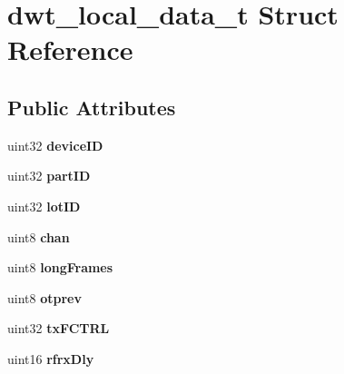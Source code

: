 \hypertarget{structdwt__local__data__t}{\section{dwt\-\_\-local\-\_\-data\-\_\-t Struct Reference}
\label{structdwt__local__data__t}
}
\subsection*{Public Attributes}
\begin{DoxyCompactItemize}
\item 
\hypertarget{structdwt__local__data__t_ad61966b6b97c1ce0865c62f374dbff82}{uint32 {\bfseries device\-I\-D}}\label{structdwt__local__data__t_ad61966b6b97c1ce0865c62f374dbff82}

\item 
\hypertarget{structdwt__local__data__t_a909a675193b5fdd7a1367b48fe6d35f1}{uint32 {\bfseries part\-I\-D}}\label{structdwt__local__data__t_a909a675193b5fdd7a1367b48fe6d35f1}

\item 
\hypertarget{structdwt__local__data__t_a710ed61fdddf71afd412400baa3bdd80}{uint32 {\bfseries lot\-I\-D}}\label{structdwt__local__data__t_a710ed61fdddf71afd412400baa3bdd80}

\item 
\hypertarget{structdwt__local__data__t_ae016b51f9d8961c68b5f11beddad4cc2}{uint8 {\bfseries chan}}\label{structdwt__local__data__t_ae016b51f9d8961c68b5f11beddad4cc2}

\item 
\hypertarget{structdwt__local__data__t_a5957f556073f450b2d834896d6a3add2}{uint8 {\bfseries long\-Frames}}\label{structdwt__local__data__t_a5957f556073f450b2d834896d6a3add2}

\item 
\hypertarget{structdwt__local__data__t_a6507cd73611daec040a2fba8b1c3a506}{uint8 {\bfseries otprev}}\label{structdwt__local__data__t_a6507cd73611daec040a2fba8b1c3a506}

\item 
\hypertarget{structdwt__local__data__t_a53a286c410d8831a8c4fef8cc1beab8c}{uint32 {\bfseries tx\-F\-C\-T\-R\-L}}\label{structdwt__local__data__t_a53a286c410d8831a8c4fef8cc1beab8c}

\item 
\hypertarget{structdwt__local__data__t_a6d069c386d9142e5b4f681a9ecaf63c8}{uint16 {\bfseries rfrx\-Dly}}\label{structdwt__local__data__t_a6d069c386d9142e5b4f681a9ecaf63c8}


\end{DoxyCompactItemize}
